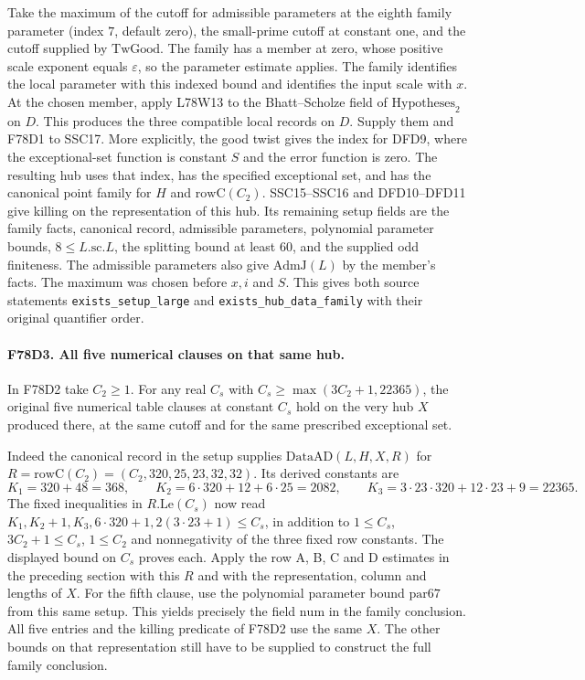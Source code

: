Take the maximum of the cutoff for admissible parameters at the
eighth family parameter (index $7$, default zero), the small-prime
cutoff at constant one, and the cutoff supplied by $\mathrm{TwGood}$.
The family has a member at zero, whose positive scale exponent equals
$\varepsilon$, so the parameter estimate applies. The family
identifies the local parameter with this indexed bound and identifies
the input scale with $x$. At the chosen member, apply L78W13 to the
Bhatt--Scholze field of $\mathrm{Hypotheses}_2$ on $D$. This
produces the three compatible local records on $D$.
Supply them and F78D1 to SSC17. More explicitly, the good twist
gives the index for DFD9, where the exceptional-set function is
constant $S$ and the error function is zero. The resulting hub
uses that index, has the specified exceptional set, and has the
canonical point family for $H$ and $\mathrm{rowC}(C_2)$.
SSC15--SSC16 and DFD10--DFD11 give killing on the representation
of this hub. Its remaining setup fields are the family facts,
canonical record, admissible parameters, polynomial parameter
bounds, $8\le L.\mathrm{sc}.L$, the splitting bound at least
$60$, and the supplied odd finiteness. The admissible parameters
also give $\mathrm{AdmJ}(L)$ by the member's facts. The maximum
was chosen before $x,i$ and $S$. This gives both source statements
\texttt{exists\_setup\_large} and \texttt{exists\_hub\_data\_family}
with their original quantifier order.

\paragraph{F78D3. All five numerical clauses on that same hub.}
In F78D2 take $C_2\ge1$. For any real $C_s$ with
$C_s\ge\max(3C_2+1,22365)$, the original five numerical table
clauses at constant $C_s$ hold on the very hub $X$ produced there,
at the same cutoff and for the same prescribed exceptional set.

Indeed the canonical record in the setup supplies
$\mathrm{DataAD}(L,H,X,R)$ for
$R=\mathrm{rowC}(C_2)=(C_2,320,25,23,32,32)$.
Its derived constants are
\[
 K_1=320+48=368,\qquad K_2=6\cdot320+12+6\cdot25=2082,
 \qquad K_3=3\cdot23\cdot320+12\cdot23+9=22365.
\]
The fixed inequalities in $R.\mathrm{Le}(C_s)$ now read
$K_1,K_2+1,K_3,6\cdot320+1,2(3\cdot23+1)\le C_s$,
in addition to $1\le C_s$, $3C_2+1\le C_s$, $1\le C_2$
and nonnegativity of the three fixed row constants.
The displayed bound on $C_s$ proves each. Apply the row A, B, C
and D estimates in the preceding section with this $R$ and with
the representation, column and lengths of $X$. For the fifth
clause, use the polynomial parameter bound $\mathrm{par67}$ from
this same setup. This yields precisely the field
$\mathrm{num}$ in the family conclusion. All five entries and
the killing predicate of F78D2 use the same $X$. The other bounds
on that representation still have to be supplied to construct the
full family conclusion.
